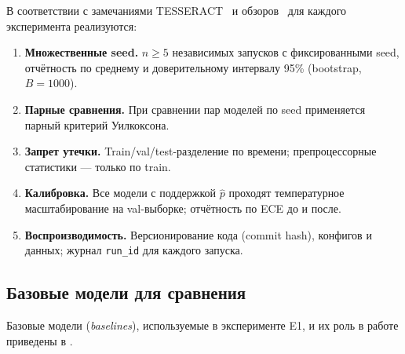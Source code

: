 В соответствии с замечаниями TESSERACT~\cite{pendlebury2019tesseract} и
обзоров~\cite{khraisat2019survey, sommer2010outside} для каждого эксперимента
реализуются:

\begin{enumerate}
    \item \textbf{Множественные seed.} \(n \geq 5\) независимых запусков
    с фиксированными seed, отчётность по среднему и доверительному интервалу
    95\% (bootstrap, \(B = 1000\)).
    \item \textbf{Парные сравнения.} При сравнении пар моделей по seed
    применяется парный критерий Уилкоксона.
    \item \textbf{Запрет утечки.} Train/val/test-разделение по времени;
    препроцессорные статистики --- только по train.
    \item \textbf{Калибровка.} Все модели с поддержкой
    \(\hat{p}\) проходят температурное масштабирование на val-выборке;
    отчётность по ECE до и после.
    \item \textbf{Воспроизводимость.} Версионирование кода (commit hash),
    конфигов и данных; журнал \texttt{run\_id} для каждого запуска.
\end{enumerate}

\subsection{Базовые модели для сравнения}

Базовые модели (\emph{baselines}), используемые в эксперименте E1, и их
роль в работе приведены в .

